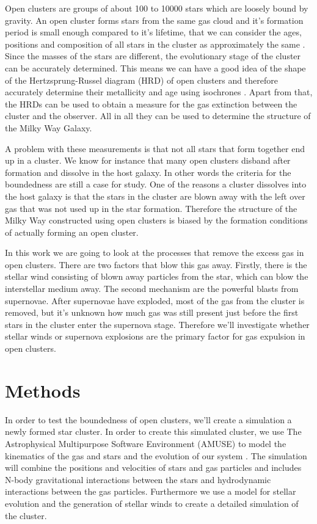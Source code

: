\documentclass[12pt, twocolumn]{article}
\begin{document}
Open clusters are groups of about 100 to \num{10000} stars which are loosely bound by gravity.
An open cluster forms stars from the same gas cloud and it's formation period is small enough compared to it's lifetime, that we can consider the ages, positions and composition of all stars in the cluster as approximately the same \parencite{Open_star_clusters}.
Since the masses of the stars are different, the evolutionary stage of the cluster can be accurately determined.
This means we can have a good idea of the shape of the Hertzsprung-Russel diagram (HRD) of open clusters and therefore accurately determine their metallicity and age using isochrones \parencite{girardi2002}.
Apart from that, the HRDs can be used to obtain a measure for the gas extinction between the cluster and the observer.
All in all they can be used to determine the structure of the Milky Way Galaxy.

A problem with these measurements is that not all stars that form together end up in a cluster.
We know for instance that many open clusters disband after formation and dissolve in the host galaxy.
In other words the criteria for the boundedness are still a case for study.
One of the reasons a cluster dissolves into the host galaxy is that the stars in the cluster are blown away with the left over gas that was not used up in the star formation.
Therefore the structure of the Milky Way constructed using open clusters is biased by the formation conditions of actually forming an open cluster.

In this work we are going to look at the processes that remove the excess gas in open clusters.
There are two factors that blow this gas away.
Firstly, there is the stellar wind consisting of blown away particles from the star, which can blow the interstellar medium away.
The second mechanism are the powerful blasts from supernovae.
After supernovae have exploded, most of the gas from the cluster is removed, but it's unknown how much gas was still present just before the first stars in the cluster enter the supernova stage.
Therefore we'll investigate whether stellar winds or supernova explosions are the primary factor for gas expulsion in open clusters.


\section{Methods}
In order to test the boundedness of open clusters, we'll create a simulation a newly formed star cluster.
In order to create this simulated cluster, we use The Astrophysical Multipurpose Software Environment (AMUSE) to model the kinematics of the gas and stars and the evolution of our system \parencite{AMUSE_book, AMUSE1, AMUSE2, AMUSE3}.
The simulation will combine the positions and velocities of stars and gas particles and includes N-body gravitational interactions between the stars and hydrodynamic interactions between the gas particles.
Furthermore we use a model for stellar evolution and the generation of stellar winds to create a detailed simulation of the cluster.
\end{document}
